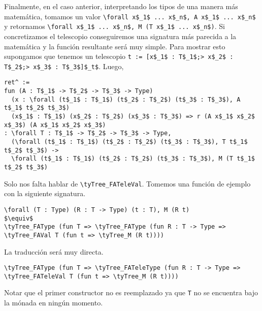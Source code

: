 Finalmente, en el caso anterior, interpretando los tipos de una manera más matemática, tomamos un valor \lstinline{\forall x$_1$ ... x$_n$, A x$_1$ ... x$_n$} y retornamos \lstinline{\forall x$_1$ ... x$_n$, M (T x$_1$ ... x$_n$)}.
Si concretizamos el telescopio conseguiremos una signatura más parecida a la matemática y la función resultante será muy simple.
Para mostrar esto supongamos que tenemos un telescopio \lstinline{t := [x$_1$ : T$_1$;> x$_2$ : T$_2$;> x$_3$ : T$_3$]$_t$}. Luego,

\begin{lstlisting}
ret^ :=
fun (A : T$_1$ -> T$_2$ -> T$_3$ -> Type)
  (x : \forall (t$_1$ : T$_1$) (t$_2$ : T$_2$) (t$_3$ : T$_3$), A t$_1$ t$_2$ t$_3$) 
  (x$_1$ : T$_1$) (x$_2$ : T$_2$) (x$_3$ : T$_3$) => r (A x$_1$ x$_2$ x$_3$) (A x$_1$ x$_2$ x$_3$)
: \forall T : T$_1$ -> T$_2$ -> T$_3$ -> Type,
  (\forall (t$_1$ : T$_1$) (t$_2$ : T$_2$) (t$_3$ : T$_3$), T t$_1$ t$_2$ t$_3$) ->
  \forall (t$_1$ : T$_1$) (t$_2$ : T$_2$) (t$_3$ : T$_3$), M (T t$_1$ t$_2$ t$_3$)
\end{lstlisting}

Solo nos falta hablar de \lstinline{\tyTree_FATeleVal}. Tomemos una función de ejemplo con la siguiente signatura.

\begin{lstlisting}
\forall (T : Type) (R : T -> Type) (t : T), M (R t)
$\equiv$
\tyTree_FAType (fun T => \tyTree_FAType (fun R : T -> Type => \tyTree_FAVal T (fun t => \tyTree_M (R t))))
\end{lstlisting}

La traducción será muy directa.

\begin{lstlisting}
\tyTree_FAType (fun T => \tyTree_FATeleType (fun R : T -> Type => \tyTree_FATeleVal T (fun t => \tyTree_M (R t))))
\end{lstlisting}

Notar que el primer constructor no es reemplazado ya que \lstinline{T} no se encuentra bajo la mónada en ningún momento.

